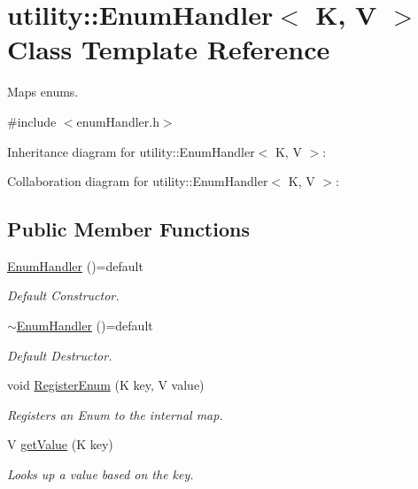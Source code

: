 \hypertarget{classutility_1_1EnumHandler}{}\section{utility\+::Enum\+Handler$<$ K, V $>$ Class Template Reference}
\label{classutility_1_1EnumHandler}


Maps enums.  




{\ttfamily \#include $<$enum\+Handler.\+h$>$}



Inheritance diagram for utility\+::Enum\+Handler$<$ K, V $>$\+:


Collaboration diagram for utility\+::Enum\+Handler$<$ K, V $>$\+:
\subsection*{Public Member Functions}
\begin{DoxyCompactItemize}
\item 
\mbox{\label{classutility_1_1EnumHandler_af49384d459fa5d1ae9af67d446ba75b1}} 
\mbox{\hyperlink{classutility_1_1EnumHandler_af49384d459fa5d1ae9af67d446ba75b1}{Enum\+Handler}} ()=default
\begin{DoxyCompactList}\small\item\em Default Constructor. \end{DoxyCompactList}\item 
\mbox{\label{classutility_1_1EnumHandler_a92372a79c030a6a049b5bce87423bab0}} 
\mbox{\hyperlink{classutility_1_1EnumHandler_a92372a79c030a6a049b5bce87423bab0}{$\sim$\+Enum\+Handler}} ()=default
\begin{DoxyCompactList}\small\item\em Default Destructor. \end{DoxyCompactList}\item 
void \mbox{\hyperlink{classutility_1_1EnumHandler_a37a6fdef5cc101d22028e6aafd2f719e}{Register\+Enum}} (K key, V value)
\begin{DoxyCompactList}\small\item\em Registers an Enum to the internal map. \end{DoxyCompactList}\item 
V \mbox{\hyperlink{classutility_1_1EnumHandler_aa24c170157579c63d265e43eb7535291}{get\+Value}} (K key)
\begin{DoxyCompactList}\small\item\em Looks up a value based on the key. \end{DoxyCompactList}\end{DoxyCompactItemize}


